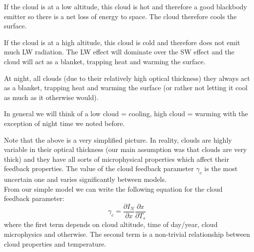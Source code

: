 If the cloud is at a low altitude, this cloud is hot and therefore a good blackbody emitter so there is a net loss of 
energy to space. The cloud therefore cools the surface.

If the cloud is at a high altitude, this cloud is cold and therefore does not emit much \gls{LW} radiation. The \gls{LW}
effect will dominate over the \gls{SW} effect and the cloud will act as a blanket, trapping heat and warming the surface.

At night, all clouds (due to their relatively high optical thickness) they always act as a blanket, trapping heat and
warming the surface (or rather not letting it cool as much as it otherwise would).\\

\begin{tcolorbox}
\noindent In general we will think of a low cloud = cooling, high cloud = warming with the exception of night time we
noted before.
\end{tcolorbox}

Note that the above is a very simplified picture. In reality, clouds are highly variable in their optical thickness (our
main assumption was that clouds are very thick) and they have all sorts of microphysical properties which affect their
feedback properties. The value of the cloud feedback parameter $\gamma_c$ is the most uncertain one and varies significantly
between models.\\

\noindent From our simple model we can write the following equation for the cloud feedback parameter:
$$
\boxed{\gamma_c = \frac{\partial I_N}{\partial x}\frac{\partial x}{\partial T_s}}
$$
where the first term depends on cloud altitude, time of day/year, cloud microphysics and otherwise. The second term is
a non-trivial relationship between cloud properties and temperature.
